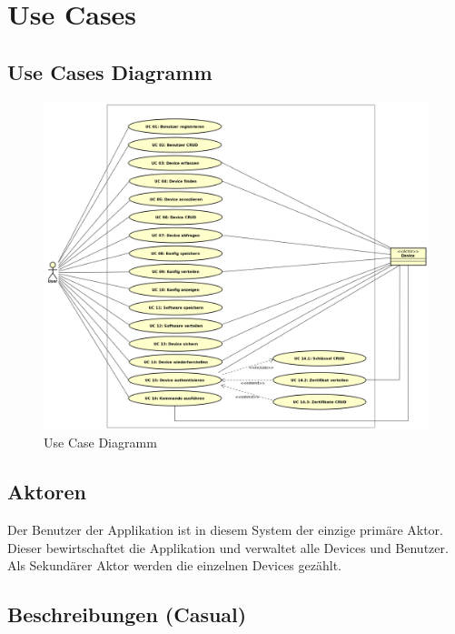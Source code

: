 \section{Use Cases}
\subsection{Use Cases Diagramm}
\begin{figure}[H]
\centering
\includegraphics[scale=0.425]{images/use_case_diagram.png}\caption{Use Case Diagramm}
\end{figure}
\subsection{Aktoren}
Der Benutzer der Applikation ist in diesem System der einzige primäre Aktor. Dieser bewirtschaftet die Applikation und verwaltet alle Devices und Benutzer. Als Sekundärer Aktor werden die einzelnen Devices gezählt.
\newpage
\subsection{Beschreibungen (Casual)}
